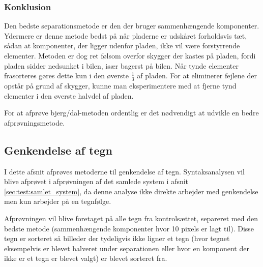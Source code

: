 \subsubsection{Konklusion}

Den bedste separationsmetode er den der bruger sammenhængende komponenter. Ydermere er denne metode bedst på når pladerne er udskåret forholdsvis tæt, sådan at komponenter, der ligger udenfor pladen, ikke vil være forstyrrende elementer. Metoden er dog ret følsom overfor skygger der kastes på pladen, fordi pladen sidder nedsunket i bilen, især bagerst på bilen. Når tynde elementer frasorteres gøres dette kun i den øverste $\frac{1}{3}$ af pladen. For at eliminerer fejlene der opstår på grund af skygger, kunne man eksperimentere med at fjerne tynd elementer i den øverste halvdel af pladen.

For at afprøve bjerg/dal-metoden ordentlig er det nødvendigt at udvikle en bedre afprøvningsmetode.

\subsection{Genkendelse af tegn}
I dette afsnit afprøves metoderne til genkendelse af tegn. Syntaksanalysen vil blive afprøvet i afprøvningen af det samlede system i afsnit \vref{sec:test:samlet_system}, da denne analyse ikke direkte arbejder med genkendelse men kun arbejder på en tegnfølge.


Afprøvningen vil blive foretaget på alle tegn fra kontrolsættet, separeret med den bedste metode (sammenhængende komponenter hvor 10 pixels er lagt til). Disse tegn er sorteret så billeder der tydeligvis ikke ligner et tegn (hvor tegnet eksempelvis er blevet halveret under separationen eller hvor en komponent der ikke er et tegn er blevet valgt) er blevet sorteret fra.

